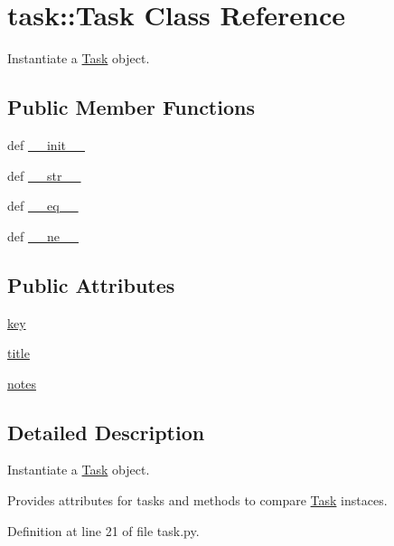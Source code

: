 \hypertarget{classtask_1_1Task}{
\section{task\-:\-:\-Task \-Class \-Reference}
\label{classtask_1_1Task}
}


\-Instantiate a \hyperlink{classtask_1_1Task}{\-Task} object.  


\subsection*{\-Public \-Member \-Functions}
\begin{DoxyCompactItemize}
\item 
def \hyperlink{classtask_1_1Task_aa3d495c785de9774c66a730535b4c08f}{\-\_\-\-\_\-init\-\_\-\-\_\-}
\item 
def \hyperlink{classtask_1_1Task_ac32eb0d8fd34e4ae11e7cb24a1c7f99d}{\-\_\-\-\_\-str\-\_\-\-\_\-}
\item 
def \hyperlink{classtask_1_1Task_a455e3fe2cfeb638a43cbc950125af569}{\-\_\-\-\_\-eq\-\_\-\-\_\-}
\item 
def \hyperlink{classtask_1_1Task_a45fab314fc54abbc30d6c979db9b4612}{\-\_\-\-\_\-ne\-\_\-\-\_\-}
\end{DoxyCompactItemize}
\subsection*{\-Public \-Attributes}
\begin{DoxyCompactItemize}
\item 
\hyperlink{classtask_1_1Task_a028cd6524320407ce6cae1c2e4f0914a}{key}
\item 
\hyperlink{classtask_1_1Task_a877528ec8ead8e0efa64d3eb1dc0e0d1}{title}
\item 
\hyperlink{classtask_1_1Task_a4f2e0a8b798d9a631c2d32c3d53e8533}{notes}
\end{DoxyCompactItemize}


\subsection{\-Detailed \-Description}
\-Instantiate a \hyperlink{classtask_1_1Task}{\-Task} object. 

\-Provides attributes for tasks and methods to compare \hyperlink{classtask_1_1Task}{\-Task} instaces. 

\-Definition at line 21 of file task.\-py.



